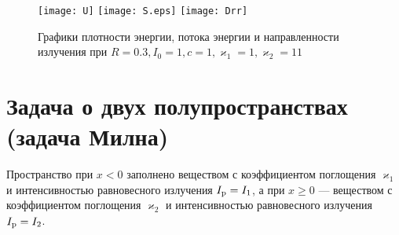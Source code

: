 \begin{figure}[ht!]%
\centering
\texttt{[image: U]}\quad%
\texttt{[image: S.eps]}\quad%
\texttt{[image: Drr]}%
\caption{Графики плотности энергии, потока энергии и направленности излучения при $R = 0.3, I_0 = 1, c = 1, \varkappa_1 = 1, \varkappa_2 = 11$}%
\end{figure}

\section{Задача о двух полупространствах (задача Милна)}

Пространство при $x < 0$ заполнено веществом с коэффициентом поглощения $\varkappa_1$ и интенсивностью равновесного излучения $I_\text{p} = I_1$,
а при $x \geq 0$ --- веществом с коэффициентом поглощения $\varkappa_2$ и интенсивностью равновесного излучения $I_\text{p} = I_2$.

